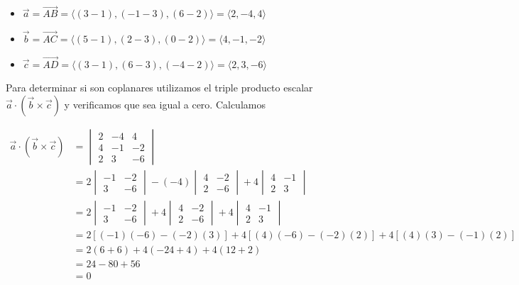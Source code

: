 \documentclass[12pt]{article}
\begin{document}
\begin{itemize}

\item $\vec{a} = \vec{AB} = \langle (3-1), (-1-3), (6-2) \rangle = \langle 2, -4, 4 \rangle$

\item $\vec{b} = \vec{AC} = \langle (5-1), (2-3), (0-2) \rangle = \langle 4, -1, -2 \rangle$

\item $\vec{c} = \vec{AD} = \langle (3-1), (6-3), (-4-2) \rangle = \langle 2, 3, -6 \rangle$
  
\end{itemize}

Para determinar si son coplanares utilizamos el triple producto escalar $\vec{a} \cdot (\vec{b} \times \vec{c})$ y verificamos que sea igual a cero. Calculamos
   
\begin{equation*}
  \begin{split}
    \vec{a} \cdot (\vec{b} \times \vec{c})
    &=
    \begin{vmatrix}
      2 & -4 & 4 \\
      4 & -1 & -2 \\
      2 & 3 & -6
    \end{vmatrix} \\
    &=
    2
    \begin{vmatrix}
      -1 & -2 \\
      3 & -6 
    \end{vmatrix}
    -
    (-4)
    \begin{vmatrix}
      4 & -2 \\
      2 & -6 
    \end{vmatrix}
    +
    4
    \begin{vmatrix}
      4 & -1 \\
      2 & 3 
    \end{vmatrix}\\
    &=
    2
    \begin{vmatrix}
      -1 & -2 \\
      3 & -6 
    \end{vmatrix}
    +
    4
    \begin{vmatrix}
      4 & -2 \\
      2 & -6 
    \end{vmatrix}
    +
    4
    \begin{vmatrix}
      4 & -1 \\
      2 & 3 
    \end{vmatrix}\\
    &=
    2[(-1)(-6)-(-2)(3)]
    +
    4[(4)(-6)-(-2)(2)]
    +
    4[(4)(3)-(-1)(2)]\\
    &=
    2(6+6)
    +
    4(-24+4)
    +
    4(12+2) \\
    &=
    24 - 80 + 56 \\
    &=
    0
  \end{split}
\end{equation*}
\end{document}
